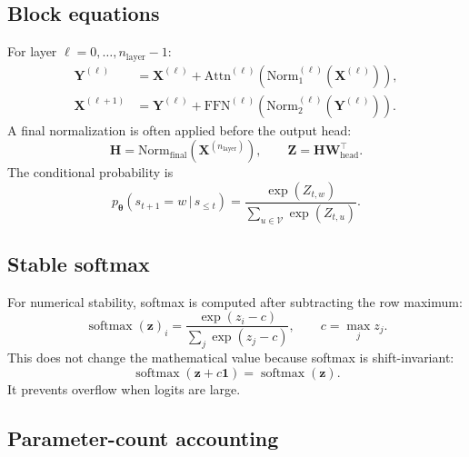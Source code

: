 \documentclass[11pt,a4paper]{article}
\theoremstyle{definition}
\theoremstyle{plain}
\newcommand{\vz}{\bm{z}}
\newcommand{\vtheta}{\bm{\theta}}
\newcommand{\mW}{\bm{W}}
\newcommand{\mX}{\bm{X}}
\newcommand{\mY}{\bm{Y}}
\newcommand{\mH}{\bm{H}}
\newcommand{\mZ}{\bm{Z}}
\newcommand{\nlayer}{n_{\mathrm{layer}}}
\newcommand{\given}{\,|\,}
\DeclareMathOperator{\softmax}{softmax}
\begin{document}
\subsection{Block equations}

For layer $\ell=0,\ldots,\nlayer-1$:
\begin{align}
    \mY^{(\ell)}
    &=\mX^{(\ell)}+
      \mathrm{Attn}^{(\ell)}\!\left(\mathrm{Norm}^{(\ell)}_1(\mX^{(\ell)})\right),\label{eq:block_attn}\\
    \mX^{(\ell+1)}
    &=\mY^{(\ell)}+
      \mathrm{FFN}^{(\ell)}\!\left(\mathrm{Norm}^{(\ell)}_2(\mY^{(\ell)})\right).\label{eq:block_ffn}
\end{align}
A final normalization is often applied before the output head:
\begin{equation}\label{eq:final_norm_logits}
    \mH=\mathrm{Norm}_{\mathrm{final}}(\mX^{(\nlayer)}),
    \qquad
    \mZ=\mH\mW_{\mathrm{head}}^{\top}.
\end{equation}
The conditional probability is
\begin{equation}\label{eq:lm_softmax}
    p_{\vtheta}(s_{t+1}=w\given s_{\le t})=
    \frac{\exp(Z_{t,w})}{\sum_{u\in\mathcal{V}}\exp(Z_{t,u})}.
\end{equation}

\subsection{Stable softmax}

For numerical stability, softmax is computed after subtracting the row maximum:
\begin{equation}\label{eq:stable_softmax}
    \softmax(\vz)_i=
    \frac{\exp(z_i-c)}{\sum_j\exp(z_j-c)},
    \qquad c=\max_j z_j.
\end{equation}
This does not change the mathematical value because softmax is shift-invariant:
\begin{equation}
    \softmax(\vz+c\mathbf{1})=\softmax(\vz).
\end{equation}
It prevents overflow when logits are large.

\subsection{Parameter-count accounting}
\end{document}
